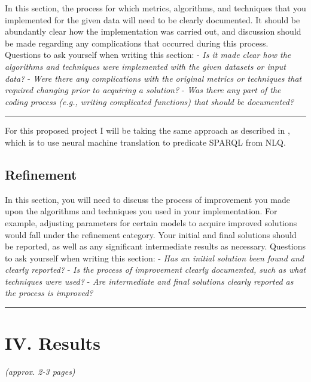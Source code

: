 \documentclass[12pt]{article}
\begin{document}
\begin{enumerate}
In this section, the process for which metrics, algorithms, and
techniques that you implemented for the given data will need to be
clearly documented. It should be abundantly clear how the implementation
was carried out, and discussion should be made regarding any
complications that occurred during this process. Questions to ask
yourself when writing this section: - \emph{Is it made clear how the
algorithms and techniques were implemented with the given datasets or
input data?} - \emph{Were there any complications with the original
metrics or techniques that required changing prior to acquiring a
solution?} - \emph{Was there any part of the coding process (e.g.,
writing complicated functions) that should be documented?}

\begin{center}\rule{0.5\linewidth}{\linethickness}\end{center}

For this proposed project I will be taking the same approach as
described in \cite{soru2018neural}, which is to use neural machine
translation to predicate SPARQL from NLQ.

\subsection{Refinement}\label{refinement}

In this section, you will need to discuss the process of improvement you
made upon the algorithms and techniques you used in your implementation.
For example, adjusting parameters for certain models to acquire improved
solutions would fall under the refinement category. Your initial and
final solutions should be reported, as well as any significant
intermediate results as necessary. Questions to ask yourself when
writing this section: - \emph{Has an initial solution been found and
clearly reported?} - \emph{Is the process of improvement clearly
documented, such as what techniques were used?} - \emph{Are intermediate
and final solutions clearly reported as the process is improved?}

\begin{center}\rule{0.5\linewidth}{\linethickness}\end{center}

\section{IV. Results}\label{iv.-results}

\emph{(approx. 2-3 pages)}


\end{enumerate}
\end{document}
